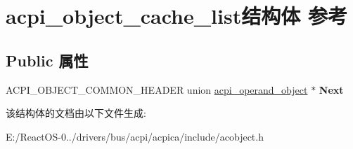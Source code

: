 \hypertarget{structacpi__object__cache__list}{}\section{acpi\+\_\+object\+\_\+cache\+\_\+list结构体 参考}
\label{structacpi__object__cache__list}
\subsection*{Public 属性}
\begin{DoxyCompactItemize}
\item 
\mbox{\label{structacpi__object__cache__list_a5465b884ce557131255d909695bda0f1}} 
A\+C\+P\+I\+\_\+\+O\+B\+J\+E\+C\+T\+\_\+\+C\+O\+M\+M\+O\+N\+\_\+\+H\+E\+A\+D\+ER union \hyperlink{unionacpi__operand__object}{acpi\+\_\+operand\+\_\+object} $\ast$ {\bfseries Next}
\end{DoxyCompactItemize}


该结构体的文档由以下文件生成\+:\begin{DoxyCompactItemize}
\item 
E\+:/\+React\+O\+S-\/0../drivers/bus/acpi/acpica/include/acobject.\+h\end{DoxyCompactItemize}
